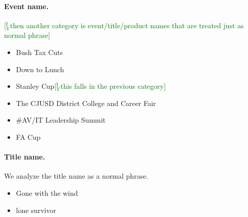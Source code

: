 \documentclass[11pt,a4paper]{article}
\newcommand{\yicomment}[1]{\textcolor{green}{[$_\mathrm{Y}^\mathrm{I}$#1]}}
\begin{document}
\paragraph{Event name.}\yicomment{then another category is event/title/product names that are treated just as normal phrase}
\begin{itemize}
	\item Bush Tax Cuts
	\item Down to Lunch
	\item Stanley Cup\yicomment{this falls in the previous category}
	\item The CJUSD District College and Career Fair
	\item \#AV/IT Leadership Summit
	\item FA Cup
\end{itemize}

\paragraph{Title name.}
We analyze the title name as a normal phrase.
\begin{itemize}
	\item Gone with the wind
	\item lone survivor
\end{itemize}
\end{document}

